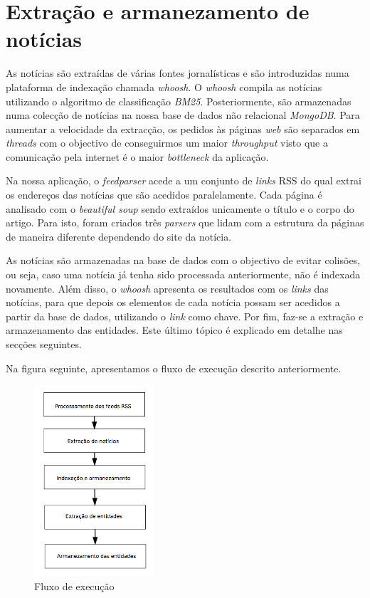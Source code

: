 \section{Extração e armanezamento de notícias}
As notícias são extraídas de várias fontes jornalísticas e são introduzidas numa plataforma de indexação chamada \textit{whoosh}. O \textit{whoosh} compila as notícias utilizando o algoritmo de classificação \textit{BM25}. Posteriormente, são armazenadas numa colecção de notícias na nossa base de dados não relacional \textit{MongoDB}. Para aumentar a velocidade da extracção, os pedidos às páginas \textit{web} são separados em \textit{threads} com o objectivo de conseguirmos um maior \textit{throughput} visto que a comunicação pela internet é o maior \textit{bottleneck} da aplicação.

Na nossa aplicação, o \textit{feedparser} acede a um conjunto de \textit{links} RSS do qual extrai os endereços das notícias que são acedidos paralelamente. Cada página é analisado com o \textit{beautiful soup} sendo extraídos unicamente o título e o corpo do artigo. Para isto, foram criados três \textit{parsers} que lidam com a estrutura da páginas de maneira diferente dependendo do site da notícia.

As notícias são armazenadas na base de dados com o objectivo de evitar colisões, ou seja, caso uma notícia já tenha sido processada anteriormente, não é indexada novamente. Além disso, o \textit{whoosh} apresenta os resultados com os \textit{links} das notícias, para que depois os elementos de cada notícia possam ser acedidos a partir da base de dados, utilizando o \textit{link} como chave. Por fim, faz-se a extração e armazenamento das entidades. Este último tópico é explicado em detalhe nas secções seguintes.

Na figura seguinte, apresentamos o fluxo de execução descrito anteriormente.

\begin{figure}[htbp]
  \centering
    \includegraphics[width=0.4\textwidth]{images/fluxo.png}
    \caption{Fluxo de execução}
\end{figure}

